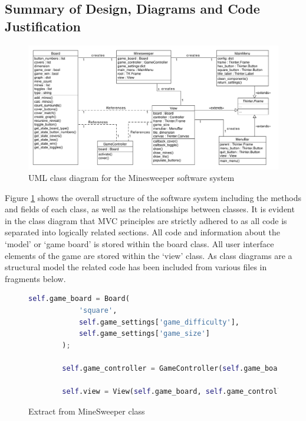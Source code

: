 \documentclass[12pt, a4]{report}
\begin{document}
\subsection{Summary of Design, Diagrams and Code Justification}
%
%
\begin{figure}[!h]
	\centering
	\includegraphics[scale=0.5]{ClassDiagram}
	\caption{UML class diagram for the Minesweeper software system}
	\label{ClassDiagram}
\end{figure}
\par Figure \ref{ClassDiagram} shows the overall structure of the software system including the methods and fields of each class, as well as the relationships between classes. It is evident in the class diagram that MVC principles are strictly adhered to as all code is separated into logically related sections. All code and information about the `model' or `game board' is stored within the board class. All user interface elements of the game are stored within the `view' class. As class diagrams are a structural model the related code has been included from various files in fragments below.

\begin{figure}[!h]
	\label{code:main}
	\begin{lstlisting}[language=python]
		self.game_board = Board(
			'square',
			self.game_settings['game_difficulty'],
			self.game_settings['game_size']
		);

		self.game_controller = GameController(self.game_board)

		self.view = View(self.game_board, self.game_controller, self.root, self.game_settings)
	\end{lstlisting}
	\caption{Extract from MineSweeper class}
\end{figure}
\end{document}
